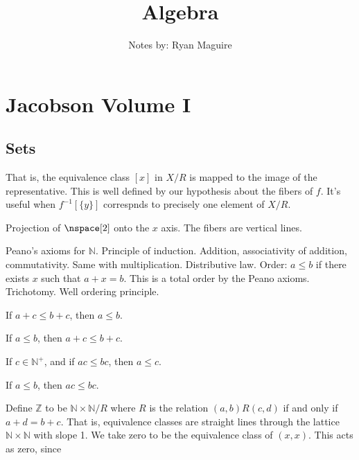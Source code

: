 \documentclass{book}                                                           %
\begin{document}
\title{Algebra}
\author{Notes by: Ryan Maguire}
\date{\vspace{-5ex}}
\maketitle
\tableofcontents
\chapter{Jacobson Volume I}
    \section{Sets}
        That is, the equivalence class $[x]$ in $X/R$ is mapped to the image of
        the representative. This is well defined by our hypothesis about the
        fibers of $f$. It's useful when $f^{\minus{1}}[\{y\}]$ correspnds to
        precisely one element of $X/R$.
        \begin{example}
            Projection of $\nspace[2]$ onto the $x$ axis. The fibers are
            vertical lines.
        \end{example}
        Peano's axioms for $\mathbb{N}$. Principle of induction. Addition,
        associativity of addition, commutativity. Same with multiplication.
        Distributive law. Order: $a\leq{b}$ if there exists $x$ such that
        $a+x=b$. This is a total order by the Peano axioms. Trichotomy.
        Well ordering principle.
        \begin{theorem}
            If $a+c\leq{b}+c$, then $a\leq{b}$.
        \end{theorem}
        \begin{theorem}
            If $a\leq{b}$, then $a+c\leq{b}+c$.
        \end{theorem}
        \begin{theorem}
            If $c\in\mathbb{N}^{+}$, and if $ac\leq{b}c$, then $a\leq{c}$.
        \end{theorem}
        \begin{theorem}
            If $a\leq{b}$, then $ac\leq{b}c$.
        \end{theorem}
        Define $\mathbb{Z}$ to be $\mathbb{N}\times\mathbb{N}/R$ where $R$
        is the relation $(a,b)R(c,d)$ if and only if $a+d=b+c$. That is,
        equivalence classes are straight lines through the lattice
        $\mathbb{N}\times\mathbb{N}$ with slope 1. We take zero to be the
        equivalence class of $(x,x)$. This acts as zero, since
\end{document}
